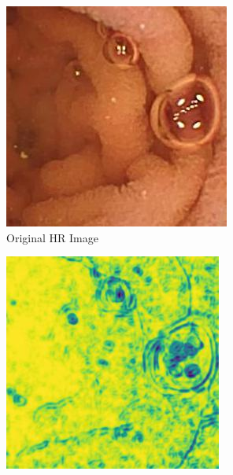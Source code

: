 \begin{figure}[H]
    \centering
    \begin{subfigure}[H]{0.275\textwidth}
    \includegraphics[width=\textwidth]{Chapter7/hr_445.jpg}
    \caption{Original HR Image}
  \end{subfigure}
  \begin{subfigure}[H]{0.275\textwidth}
    \includegraphics[width=\textwidth]{Chapter7/SSIM_bicubic_445.jpg}

\end{subfigure}
\end{figure}
